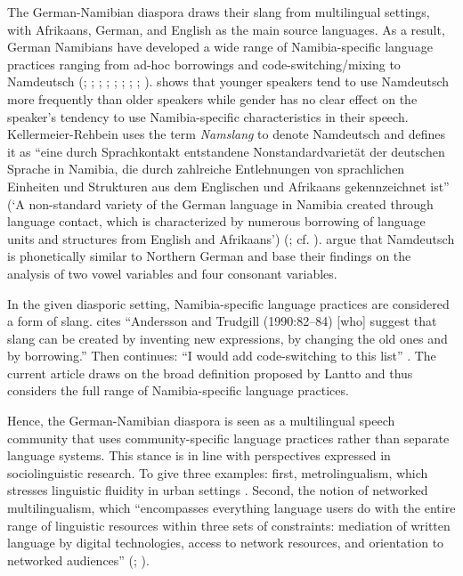 \documentclass[output=paper]{langsci/langscibook}
\begin{document}
The German-Namibian diaspora draws their slang from multilingual settings, with Afrikaans, German, and English as the main source languages. As a result, German Namibians have developed a wide range of Namibia-specific language practices ranging from ad-hoc borrowings and code-switching/mixing to Namdeutsch (\citealt{bohm_deutsch_2003}; \citealt{duck_namibia_2018}; \citealt{gretschel_status_1995}; \citealt{kellermeier-rehbein_namslang_2015, kellermeier-rehbein_sprache_2016}; \citealt{nockler_sprachmischung_1963}; \citealt{putz_sudwesterdeutsch_1991}; \citealt{wiese_deutsch_2014, wiese_german_2017}; \citealt{wiese_registerdifferenzierung_2021}; \citealt{zimmer_deutsch_2019}). 
 shows that younger speakers tend to use Namdeutsch more frequently than older speakers while gender has no clear effect on the speaker’s tendency to use Namibia-specific characteristics in their speech. Kellermeier-Rehbein uses the term \textit{Namslang} to denote Namdeutsch and defines it as “eine durch Sprachkontakt entstandene Nonstandardvarietät der deutschen Sprache in Namibia, die durch zahlreiche Entlehnungen von sprachlichen Einheiten und Strukturen aus dem Englischen und Afrikaans gekennzeichnet ist” (‘A non-standard variety of the German language in Namibia created through language contact, which is characterized by numerous borrowing of language units and structures from English and Afrikaans’) (\citealt[228]{kellermeier-rehbein_sprache_2016}; cf. \citealt{radke_urban_inpress}).  argue that Namdeutsch is phonetically similar to Northern German and base their findings on the analysis of two vowel variables and four consonant variables. 

In the given diasporic setting, Namibia-specific language practices are considered a form of slang. \citet[634]{lantto_code-switching_2014} cites “Andersson and Trudgill (1990:82–84) [who] suggest that slang can be created by inventing new expressions, by changing the old ones and by borrowing.” Then \citet[634]{lantto_code-switching_2014} continues: “I would add code-switching to this list” . The current article draws on the broad definition proposed by Lantto and thus considers the full range of Namibia-specific language practices. 

Hence, the German-Namibian diaspora is seen as a multilingual speech community that uses community-specific language practices rather than separate language systems. This stance is in line with perspectives expressed in sociolinguistic research. To give three examples: first, metrolingualism, which stresses linguistic fluidity in urban settings \citep{otsuji_metrolingualism:_2010}. Second, the notion of networked multilingualism, which “encompasses everything language users do with the entire range of linguistic resources within three sets of constraints: mediation of written language by digital technologies, access to network resources, and orientation to networked audiences” (\citealt[185]{androutsopoulos_networked_2015}; \citealt{radke_urban_inpress}). 
\end{document}
